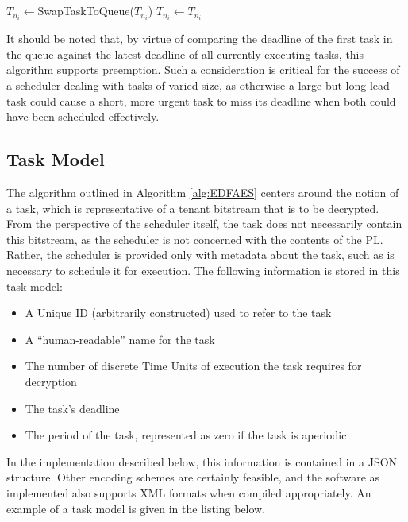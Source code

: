 \begin{algorithm}
\begin{algorithmic}
                    \\
                    \State {}
                    \\

                        \State $T_{n_i} \gets $SwapTaskToQueue($T_{n_i}$)
                    \Else
                        \State $T_{n_i} \gets T_{n_i}$
                    \EndIf
                \EndIf
            \EndFor
        \EndWhile
    \end{algorithmic}
\end{algorithm}

It should be noted that, by virtue of comparing the deadline of the first task in the queue against the latest deadline of all currently executing tasks, this algorithm supports preemption. Such a consideration is critical for the success of a scheduler dealing with tasks of varied size, as otherwise a large but long-lead task could cause a short, more urgent task to miss its deadline when both could have been scheduled effectively.

\subsection{Task Model}\label{subsec:TaskModel}
The algorithm outlined in Algorithm \ref{alg:EDFAES} centers around the notion of a task, which is representative of a tenant bitstream that is to be decrypted. From the perspective of the scheduler itself, the task does not necessarily contain this bitstream, as the scheduler is not concerned with the contents of the PL. Rather, the scheduler is provided only with metadata about the task, such as is necessary to schedule it for execution. The following information is stored in this task model:

\begin{itemize}
    \item A Unique ID (arbitrarily constructed) used to refer to the task
    \item A ``human-readable'' name for the task
    \item The number of discrete Time Units of execution the task requires for decryption
    \item The task's deadline
    \item The period of the task, represented as zero if the task is aperiodic
\end{itemize}
In the implementation described below, this information is contained in a JSON structure. Other encoding schemes are certainly feasible, and the software as implemented also supports XML formats when compiled appropriately. An example of a task model is given in the listing below.

